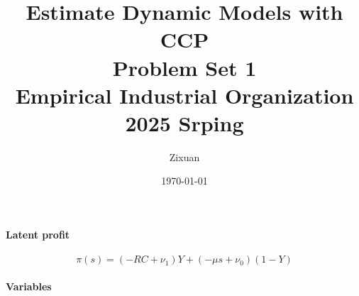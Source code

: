 \documentclass[12pt]{article}[margin=1in]
\title{\textbf{Estimate Dynamic Models with CCP} \\
\vspace{.3cm}
\large Problem Set 1 \\
Empirical Industrial Organization 2025 Srping}
\author{Zixuan}
\date{\today}
\begin{document}
\maketitle

\setcounter{page}{1}

\paragraph{Latent profit}

\begin{equation}
    \pi(s) = (-RC + \nu_1)Y + (-\mu s + \nu_0)(1 - Y)
\end{equation}

\paragraph{Variables}
\end{document}
